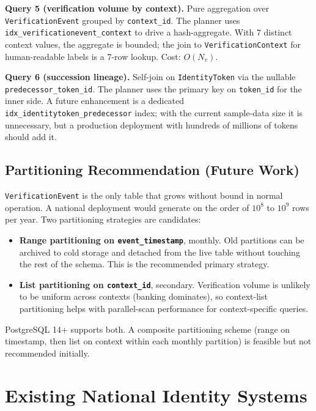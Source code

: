 \documentclass[11pt,letterpaper]{article}
\newcommand{\entity}[1]{\texttt{\color{navydark}#1}}
\begin{document}
\textbf{Query 5 (verification volume by context).} Pure aggregation over \entity{VerificationEvent} grouped by \texttt{context\_id}. The planner uses \texttt{idx\_verificationevent\_context} to drive a hash-aggregate. With 7 distinct context values, the aggregate is bounded; the join to \entity{VerificationContext} for human-readable labels is a 7-row lookup. Cost: $O(N_v)$.

\textbf{Query 6 (succession lineage).} Self-join on \entity{IdentityToken} via the nullable \texttt{predecessor\_token\_id}. The planner uses the primary key on \texttt{token\_id} for the inner side. A future enhancement is a dedicated \texttt{idx\_identitytoken\_predecessor} index; with the current sample-data size it is unnecessary, but a production deployment with hundreds of millions of tokens should add it.

\subsection*{Partitioning Recommendation (Future Work)}

\entity{VerificationEvent} is the only table that grows without bound in normal operation. A national deployment would generate on the order of $10^8$ to $10^9$ rows per year. Two partitioning strategies are candidates:

\begin{itemize}
  \item \textbf{Range partitioning on \texttt{event\_timestamp}}, monthly. Old partitions can be archived to cold storage and detached from the live table without touching the rest of the schema. This is the recommended primary strategy.
  \item \textbf{List partitioning on \texttt{context\_id}}, secondary. Verification volume is unlikely to be uniform across contexts (banking dominates), so context-list partitioning helps with parallel-scan performance for context-specific queries.
\end{itemize}

PostgreSQL 14+ supports both. A composite partitioning scheme (range on timestamp, then list on context within each monthly partition) is feasible but not recommended initially.

\section{Existing National Identity Systems}
\label{app:comparison}
\end{document}
